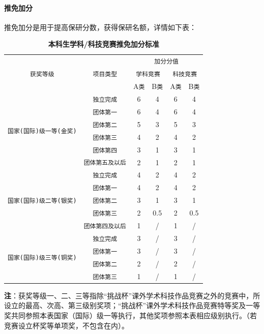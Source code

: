 \documentclass[
decoration,  %
]{qyxf-book}
\begin{document}
\paragraph{推免加分}
推免加分是用于提高保研分数，获得保研名额，详情如下表：
\begin{table}[H]
	\centering
	\caption{\textbf{本科生学科/科技竞赛推免加分标准}}
	\begin{tabular}{|c|c|c|c|c|c|}
		\hline
		\multirow{3}{*}{\texttt{获奖等级}}&\multirow{3}{*}{\texttt{项目类型}}&\multicolumn{4}{|c|}{\texttt{加分分值}}\\
		\cline{3-6}
		&&\multicolumn{2}{|c|}{\texttt{学科竞赛}}&\multicolumn{2}{|c|}{\texttt{科技竞赛}}\\
		\cline{3-6}
		&&A\texttt{类}&B\texttt{类}&A\texttt{类}&B\texttt{类}\\
		\hline
		\multirow{6}{*}{\texttt{国家(国际)级一等(金奖)}}&\texttt{独立完成}&6&4&6&4\\
		\cline{2-6}
		&\texttt{团体第一}&6&4&6&4\\
		\cline{2-6}
		&\texttt{团体第二}&5&3&5&3\\
		\cline{2-6}
		&\texttt{团体第三}&4&2&4&2\\
		\cline{2-6}
		&\texttt{团体第四}&3&1&3&1\\
		\cline{2-6}
		&\texttt{团体第五及以后}&2&1&2&1\\
		\hline
		\multirow{5}{*}{\texttt{国家(国际)级二等(银奖)}}&\texttt{独立完成}&4&2&4&2\\
		\cline{2-6}
		&\texttt{团体第一}&4&2&4&2\\
		\cline{2-6}
		&\texttt{团体第二}&3&1&3&1\\
		\cline{2-6}
		&\texttt{团体第三}&2&0.5&2&0.5\\
		\cline{2-6}
		&\texttt{团体第四及以后}&1&/&1&/\\
		\hline
		\multirow{4}{*}{\texttt{国家(国际)级三等(铜奖)}}&\texttt{独立完成}&3&/&3&/\\
		\cline{2-6}
		&\texttt{团体第一}&3&/&3&/\\
		\cline{2-6}
		&\texttt{团体第二}&2&/&2&/\\
		\cline{2-6}
		&\texttt{团体第三}&1&/&1&/\\
		\hline
	\end{tabular}
\end{table}
\textbf{注}：获奖等级一、二、三等指除“挑战杯”课外学术科技作品竞赛之外的竞赛中，所设立的最高、次高、第三级别奖项；“挑战杯”课外学术科技作品竞赛特等奖及一等奖共同参照本表国家（国际）级一等执行，其他奖项参照本表相应级别执行。（若竞赛设立杯奖等单项奖，不包含在内）。
\end{document}
